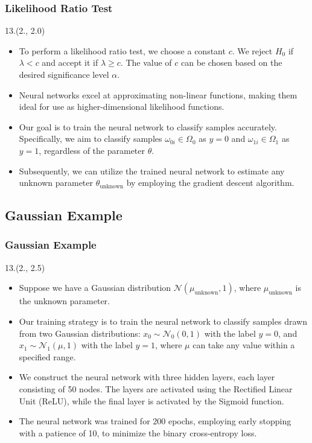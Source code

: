 \documentclass[12pt, xcolor={dvipsnames}, aspectratio = 169, sans,mathserif]{beamer}
\newenvironment{List}[2]
{\begin{textblock}{#1}#2
\begin{itemize}}
{\end{itemize}
\end{textblock}}
\newcommand{\NPcite}[1]{{\tiny \footfullcite{#1}}}
\begin{document}
\begin{frame}
\frametitle{Likelihood Ratio Test}

\begin{List}{13.}{(2., 2.0)}

  \item To perform a likelihood ratio test, we choose a constant $c$. We reject $H_0$ if $\lambda < c$ and accept it if
  $\lambda \geq c$. The value of $c$ can be chosen based on the desired significance level $\alpha$.

  \item Neural networks excel at approximating non-linear functions, making them ideal for use as higher-dimensional
  likelihood functions.

  \item Our goal is to train the neural network to classify samples accurately. Specifically, we aim to classify samples
  $\omega_{0i} \in \Omega_0$ as $y = 0$ and $\omega_{1i} \in \Omega_1$ as $y = 1$, regardless of the parameter $\theta$.

  \item Subsequently, we can utilize the trained neural network to estimate any unknown parameter $\theta_{\text{unknown}}$ by employing
  the gradient descent algorithm.\NPcite{Andreassen:2019nnm}

\end{List}

\end{frame}

\subsection{Gaussian Example}

\begin{frame}
\frametitle{Gaussian Example}

\begin{List}{13.}{(2., 2.5)}

  \item Suppose we have a Gaussian distribution $\mathcal{N}(\mu_{\text{unknown}}, 1)$, where $\mu_{\text{unknown}}$ is
  the unknown parameter.

  \item Our training strategy is to train the neural network to classify samples drawn from two Gaussian distributions:
  $x_{0} \sim \mathcal{N}_{0}(0, 1)$ with the label $y = 0$, and $x_{1} \sim \mathcal{N}_{1}(\mu, 1)$ with the label $y = 1$,
  where $\mu$ can take any value within a specified range.

  \item We construct the neural network with three hidden layers, each layer consisting of 50 nodes.
  The layers are activated using the Rectified Linear Unit (ReLU), while the final layer is activated by the Sigmoid function.

  \item The neural network was trained for 200 epochs, employing early stopping with a patience of 10, to minimize the
  binary cross-entropy loss.

\end{List}

\end{frame}
\end{document}
